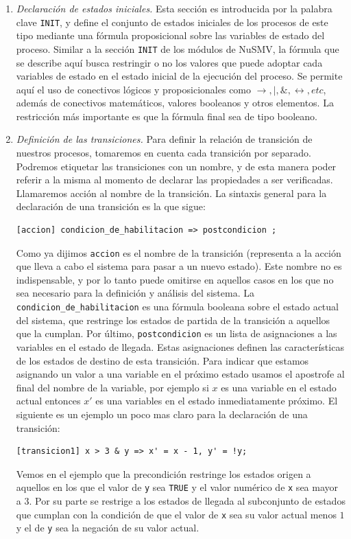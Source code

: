 \documentclass[pdftex,a4paper,12pt]{book}
\begin{document}
\begin{enumerate}
\item \textit{Declaraci\'on de estados iniciales.}
Esta secci\'on es introducida por la palabra clave \texttt{INIT}, y define el conjunto de estados iniciales de los procesos de este tipo mediante una f\'ormula proposicional sobre las variables de estado del proceso. Similar a la secci\'on \texttt{INIT} de los m\'odulos de NuSMV, la f\'ormula que se describe aqu\'i busca restringir o no los valores que puede adoptar cada variables de estado en el estado inicial de la ejecuci\'on del proceso. Se permite aqu\'i el uso de conectivos l\'ogicos y proposicionales como $\rightarrow, |, \&, \leftrightarrow, etc$, adem\'as de conectivos matem\'aticos, valores booleanos y otros elementos. La restricci\'on m\'as importante es que la f\'ormula final sea de tipo booleano.

\item \textit{Definici\'on de las transiciones.}
Para definir la relaci\'on de transici\'on de nuestros procesos, tomaremos en cuenta cada transici\'on por separado. Podremos etiquetar las transiciones con un nombre, y de esta manera poder referir a la misma al momento de declarar las propiedades a ser verificadas. Llamaremos acci\'on al nombre de la transici\'on. La sintaxis general para la declaraci\'on de una transici\'on es la que sigue: 
\begin{verbatim}
[accion] condicion_de_habilitacion => postcondicion ;
\end{verbatim}
Como ya dijimos \texttt{accion} es el nombre de la transici\'on (representa a la acci\'on que lleva a cabo el sistema para pasar a un nuevo estado). Este nombre no es indispensable, y por lo tanto puede omitirse en aquellos casos en los que no sea necesario para la definici\'on y an\'alisis del sistema. La \texttt{condicion\_de\_habilitacion} es una f\'ormula booleana sobre el estado actual del sistema, que restringe los estados de partida de la transici\'on a aquellos que la cumplan. Por \'ultimo, \texttt{postcondicion} es un lista de asignaciones a las variables en el estado de llegada. Estas asignaciones definen las caracter\'isticas de los estados de destino de esta transici\'on. Para indicar que estamos asignando un valor a una variable en el pr\'oximo estado usamos el apostrofe al final del nombre de la variable, por ejemplo si $x$ es una variable en el estado actual entonces $x'$ es una variables en el estado inmediatamente pr\'oximo. El siguiente es un ejemplo un poco mas claro para la declaraci\'on de una transici\'on:
\begin{verbatim}
[transicion1] x > 3 & y => x' = x - 1, y' = !y;
\end{verbatim}
Vemos en el ejemplo que la precondici\'on restringe los estados origen a aquellos en los que el valor de \texttt{y} sea \texttt{TRUE} y el valor num\'erico de \texttt{x} sea mayor a $3$. Por su parte se restrige a los estados de llegada al subconjunto de estados que cumplan con la condici\'on de que el valor de \texttt{x} sea su valor actual menos $1$ y el de \texttt{y} sea la negaci\'on de su valor actual.
\end{enumerate}
\end{document}
